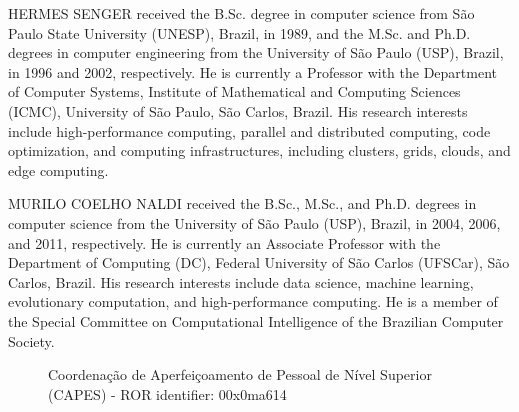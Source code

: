 \documentclass{ieeeaccess}
\newcounter{biography}
\begin{document}
\begin{IEEEbiographynophoto}{HERMES SENGER}
received the B.Sc. degree in computer science from São Paulo State University
(UNESP), Brazil, in 1989, and the M.Sc. and Ph.D. degrees in computer
engineering from the University of São Paulo (USP), Brazil, in 1996 and 2002,
respectively. He is currently a Professor with the Department of Computer
Systems, Institute of Mathematical and Computing Sciences (ICMC), University of
São Paulo, São Carlos, Brazil. His research interests include high-performance
computing, parallel and distributed computing, code optimization, and computing
infrastructures, including clusters, grids, clouds, and edge computing.
\end{IEEEbiographynophoto}

\begin{IEEEbiographynophoto}{MURILO COELHO NALDI}
received the B.Sc., M.Sc., and Ph.D. degrees in computer science from the
University of São Paulo (USP), Brazil, in 2004, 2006, and 2011, respectively. He
is currently an Associate Professor with the Department of Computing (DC),
Federal University of São Carlos (UFSCar), São Carlos, Brazil. His research
interests include data science, machine learning, evolutionary computation, and
high-performance computing. He is a member of the Special Committee on
Computational Intelligence of the Brazilian Computer Society.
\end{IEEEbiographynophoto}

\begin{figure}[!b]
\centering
Coordenação de Aperfeiçoamento de Pessoal de Nível Superior (CAPES) - ROR
identifier: 00x0ma614
\end{figure}

\EOD
\end{document}
